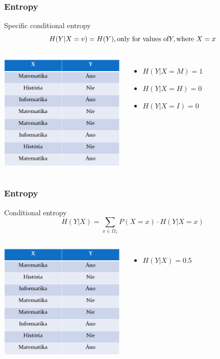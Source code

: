 \documentclass{beamer}
\begin{document}
\begin{frame}
\frametitle{Entropy}
  \centering
  Specific conditional entropy
  \begin{equation*}
  H(Y| X = v) = H(Y), \textnormal{only for values of} Y, \textnormal{where } X = x 
  \end{equation*}  

\begin{columns}[onlytextwidth,T]


  \column{27mm}
  \includegraphics[width=60mm]{tabulka.png}
  
  \column{\dimexpr\linewidth-60mm-6mm}

  \begin{itemize}
  \item<2-> $H(Y| X = M) = 1$
  \item<3-> $H(Y| X = H) = 0$
  \item<4-> $H(Y| X = I) = 0$
  \end{itemize}
\end{columns}
\end{frame}


\begin{frame}
\frametitle{Entropy}
  \centering
  Conditional entropy
  \begin{equation*}
  H(Y| X) = \sum_{x \in \Omega_x} P(X = x) \cdot H(Y | X = x)
  \end{equation*}  

\begin{columns}[onlytextwidth,T]


  \column{27mm}
  \includegraphics[width=60mm]{tabulka.png}
  
  \column{\dimexpr\linewidth-60mm-6mm}

  \begin{itemize}
  \item<2-> $H(Y|X) = 0.5$
  \end{itemize}
\end{columns}
\end{frame}
\end{document}
